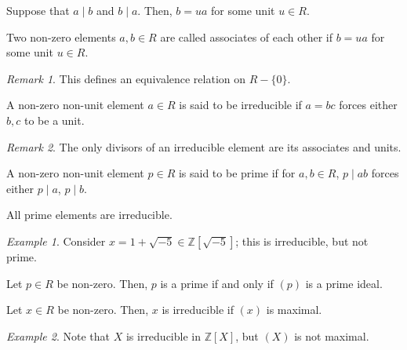 \documentclass[11pt]{article}
\newcommand{\Z}{\mathbb{Z}}
\theoremstyle{definition}
\theoremstyle{remark}
\newtheorem*{remark}{Remark}
\newtheorem*{example}{Example}
\numberwithin{equation}{section}
\begin{document}
    \begin{lemma}
        Suppose that $a\mid b$ and $b \mid a$. Then, $b = ua$ for some unit $u \in
        R$.
    \end{lemma}

    \begin{definition}
        Two non-zero elements $a, b \in R$ are called associates of each other if $b
        = ua$ for some unit $u \in R$.
        \begin{remark}
            This defines an equivalence relation on $R - \{0\}$.
        \end{remark}
    \end{definition}

    \begin{definition}
        A non-zero non-unit element $a \in R$ is said to be irreducible if $a = bc$
        forces either $b, c$ to be a unit.
        \begin{remark}
            The only divisors of an irreducible element are its associates and units.
        \end{remark}
    \end{definition}

    \begin{definition}
        A non-zero non-unit element $p \in R$ is said to be prime if for $a, b \in
        R$, $p \mid ab$ forces either $p \mid a$, $p \mid b$.
    \end{definition}

    \begin{lemma}
        All prime elements are irreducible.
    \end{lemma}
    \begin{example}
        Consider $x = 1 + \sqrt{-5} \in \Z[\sqrt{-5}]$; this is irreducible, but not
        prime.
    \end{example}


    \begin{theorem}
        Let $p \in R$ be non-zero. Then, $p$ is a prime if and only if $(p)$ is a
        prime ideal.
    \end{theorem}

    \begin{theorem}
        Let $x \in R$ be non-zero. Then, $x$ is irreducible if $(x)$ is maximal.
    \end{theorem}

    \begin{example}
        Note that $X$ is irreducible in $\Z[X]$, but $(X)$ is not maximal.
    \end{example}
\end{document}
